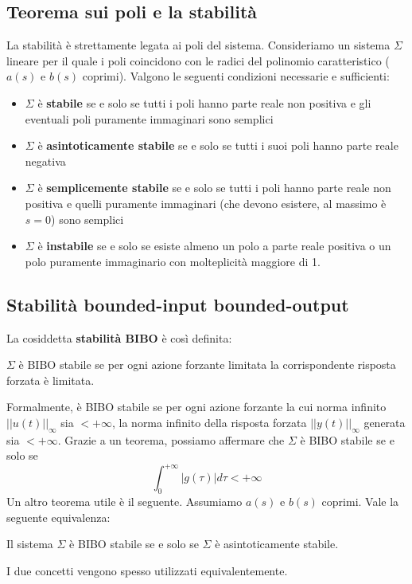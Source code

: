 \documentclass[11pt]{article}
\begin{document}
\subsection{Teorema sui poli e la stabilità}
La stabilità è strettamente legata ai poli del sistema. Consideriamo un sistema $\Sigma$ lineare per il quale i poli coincidono con le radici del polinomio caratteristico ($a(s)$ e $b(s)$ coprimi). Valgono le seguenti condizioni necessarie e sufficienti:
\begin{itemize}
    \item $\Sigma$ è \textbf{stabile} se e solo se tutti i poli hanno parte reale non positiva e gli eventuali poli puramente immaginari sono semplici
    \item $\Sigma$ è \textbf{asintoticamente stabile} se e solo se tutti i suoi poli hanno parte reale negativa
    \item $\Sigma$ è \textbf{semplicemente stabile} se e solo se tutti i poli hanno parte reale non positiva e quelli puramente immaginari (che devono esistere, al massimo è $s=0$) sono semplici 
    \item $\Sigma$ è \textbf{instabile} se e solo se esiste almeno un polo a parte reale positiva o un polo puramente immaginario con molteplicità maggiore di 1.
\end{itemize}
\subsection{Stabilità bounded-input bounded-output}
La cosiddetta \textbf{stabilità BIBO} è così definita:
\begin{center}
    $\Sigma$ è BIBO stabile se per ogni azione forzante limitata la corrispondente risposta forzata è limitata.
\end{center}
Formalmente, è BIBO stabile se per ogni azione forzante la cui norma infinito $||u(t)||_\infty$ sia $<+\infty$, la norma infinito della risposta forzata $||y(t)||_\infty$ generata sia $<+\infty$.
Grazie a un teorema, possiamo affermare che $\Sigma$ è BIBO stabile se e solo se 
\begin{displaymath}
    \int_0^{+\infty} |g(\tau)|d\tau < +\infty
\end{displaymath}
Un altro teorema utile è il seguente. Assumiamo $a(s)$ e $b(s)$ coprimi. Vale la seguente equivalenza:
\begin{center}
    Il sistema $\Sigma$ è BIBO stabile se e solo se $\Sigma$ è asintoticamente stabile. 
\end{center}
I due concetti vengono spesso utilizzati equivalentemente.
\end{document}
